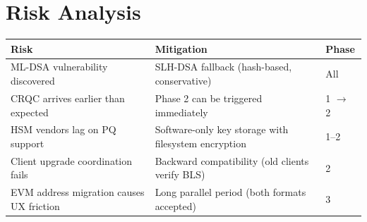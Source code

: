 \section{Risk Analysis}


\begin{center}
\begin{tabular}{lll}
\toprule
\textbf{Risk} & \textbf{Mitigation} & \textbf{Phase} \\
\midrule
ML-DSA vulnerability discovered & SLH-DSA fallback (hash-based, conservative) & All \\
CRQC arrives earlier than expected & Phase 2 can be triggered immediately & 1 $\to$ 2 \\
HSM vendors lag on PQ support & Software-only key storage with filesystem encryption & 1--2 \\
Client upgrade coordination fails & Backward compatibility (old clients verify BLS) & 2 \\
EVM address migration causes UX friction & Long parallel period (both formats accepted) & 3 \\
\bottomrule
\end{tabular}
\end{center}

